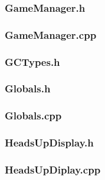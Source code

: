 \documentclass{article}
\begin{document}
\subsubsection{GameManager.h}
	

\subsubsection{GameManager.cpp}
	
	 				
\subsubsection{GCTypes.h}
	
	 				
\subsubsection{Globals.h}
	 
	 				
\subsubsection{Globals.cpp}
	 
	 				
	 				
\subsubsection{HeadsUpDisplay.h}
	 
	 				
\subsubsection{HeadsUpDiplay.cpp}
	 		
	 				
\end{document}

